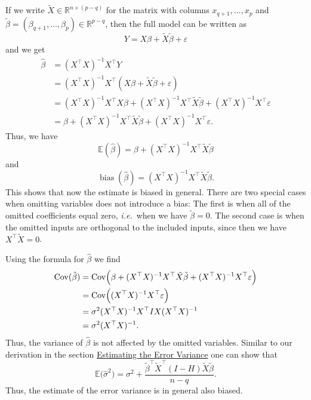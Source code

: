 \documentclass[
  a4paper,
]{article}
\theoremstyle{definition}
\theoremstyle{definition}
\theoremstyle{definition}
\theoremstyle{definition}
\theoremstyle{remark}
\begin{document}
If we write \(\tilde X \in \mathbb{R}^{n\times (p-q)}\) for the matrix with columns
\(x_{q+1}, \ldots, x_p\) and \(\tilde\beta = (\beta_{q+1}, \ldots, \beta_p) \in
\mathbb{R}^{p-q}\), then the full model can be written as
\begin{equation*}
  Y
  = X \beta + \tilde X \tilde\beta + \varepsilon
\end{equation*}
and we get
\begin{align*}
  \hat\beta
  &= (X^\top X)^{-1} X^\top Y \\
  &= (X^\top X)^{-1} X^\top (X \beta + \tilde X \tilde\beta + \varepsilon) \\
  &= (X^\top X)^{-1} X^\top X \beta + (X^\top X)^{-1} X^\top \tilde X \tilde\beta + (X^\top X)^{-1} X^\top \varepsilon\\
  &= \beta + (X^\top X)^{-1} X^\top \tilde X \tilde\beta + (X^\top X)^{-1} X^\top \varepsilon.
\end{align*}
Thus, we have
\begin{equation*}
  \mathbb{E}(\hat\beta)
  = \beta + (X^\top X)^{-1} X^\top \tilde X \tilde\beta
\end{equation*}
and
\begin{equation*}
  \mathop{\mathrm{bias}}(\hat\beta)
  = (X^\top X)^{-1} X^\top \tilde X \tilde\beta.
\end{equation*}
This shows that now the estimate is biased in general. There are two
special cases when omitting variables does not introduce a bias:
The first is when all of the omitted coefficients equal zero, \emph{i.e.}~when
we have \(\tilde\beta = 0\). The second case is when the omitted inputs are
orthogonal to the included inputs, since then we have \(X^\top \tilde X = 0\).

Using the formula for \(\hat\beta\) we find
\begin{align*}
  \mathop{\mathrm{Cov}}( \hat\beta )
  &= \mathop{\mathrm{Cov}}\Bigl( \beta + (X^\top X)^{-1} X^\top \tilde X \tilde\beta + (X^\top X)^{-1} X^\top \varepsilon\Bigr) \\
  &= \mathop{\mathrm{Cov}}\Bigl( (X^\top X)^{-1} X^\top \varepsilon\Bigr) \\
  &= \sigma^2 (X^\top X)^{-1} X^\top I X (X^\top X)^{-1} \\
  &= \sigma^2 (X^\top X)^{-1}.
\end{align*}
Thus, the variance of \(\hat\beta\) is not affected by the omitted variables.
Similar to our derivation in the section \hyperref[var-est-bias]{Estimating the Error Variance}
one can show that
\begin{equation*}
  \mathbb{E}\bigl( \hat\sigma^2 \bigr)
  = \sigma^2 + \frac{\tilde\beta^\top \tilde X^\top (I - H) \tilde X \tilde \beta}{n-q}.
\end{equation*}
Thus, the estimate of the error variance is in general also biased.
\end{document}
